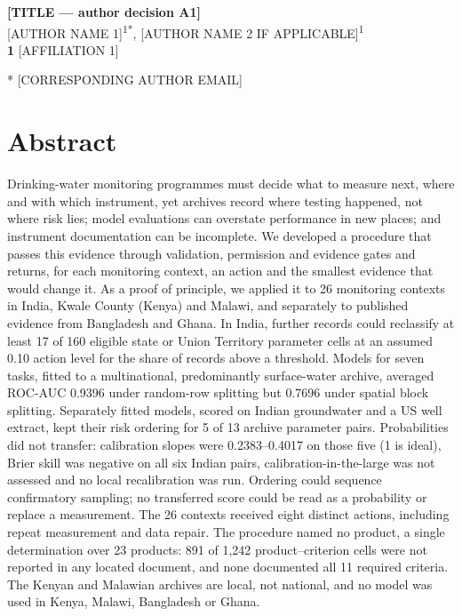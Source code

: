 \documentclass[10pt,letterpaper]{article}
\begin{document}
\vspace*{0.2in}

\begin{flushleft}
{\Large
\textbf{[TITLE --- author decision A1]} %
}
\newline
\\
{[AUTHOR NAME 1]}\textsuperscript{1*},
{[AUTHOR NAME 2 IF APPLICABLE]}\textsuperscript{1}
\\
\bigskip
\textbf{1} [AFFILIATION 1]
\\
\bigskip

* [CORRESPONDING AUTHOR EMAIL]

\end{flushleft}
\section*{Abstract}
Drinking-water monitoring programmes must decide what to measure next, where and with which instrument, yet archives record where testing happened, not where risk lies; model evaluations can overstate performance in new places; and instrument documentation can be incomplete. We developed a procedure that passes this evidence through validation, permission and evidence gates and returns, for each monitoring context, an action and the smallest evidence that would change it. As a proof of principle, we applied it to 26 monitoring contexts in India, Kwale County (Kenya) and Malawi, and separately to published evidence from Bangladesh and Ghana. In India, further records could reclassify at least 17 of 160 eligible state or Union Territory \texttimes{} parameter cells at an assumed 0.10 action level for the share of records above a threshold. Models for seven tasks, fitted to a multinational, predominantly surface-water archive, averaged ROC-AUC 0.9396 under random-row splitting but 0.7696 under spatial block splitting. Separately fitted models, scored on Indian groundwater and a US well extract, kept their risk ordering for 5 of 13 archive \texttimes{} parameter pairs. Probabilities did not transfer: calibration slopes were 0.2383--0.4017 on those five (1 is ideal), Brier skill was negative on all six Indian pairs, calibration-in-the-large was not assessed and no local recalibration was run. Ordering could sequence confirmatory sampling; no transferred score could be read as a probability or replace a measurement. The 26 contexts received eight distinct actions, including repeat measurement and data repair. The procedure named no product, a single determination over 23 products: 891 of 1,242 product--criterion cells were not reported in any located document, and none documented all 11 required criteria. The Kenyan and Malawian archives are local, not national, and no model was used in Kenya, Malawi, Bangladesh or Ghana.
\end{document}
